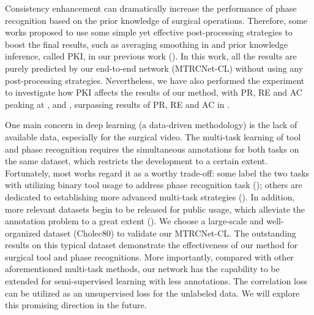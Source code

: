 \documentclass{elsarticle}
\begin{document}
Consistency enhancement can dramatically increase the performance of phase recognition based on the prior knowledge of surgical operations.
Therefore, some works proposed to use some simple yet effective post-processing strategies to boost the final results, such as averaging smoothing in \cite{cadene2016m2cai} and prior knowledge inference, called PKI, in our previous work (\cite{jin2018sv}).
In this work, all the results are purely predicted by our end-to-end network (MTRCNet-CL) without using any post-processing strategies.
Nevertheless, we have also performed the experiment to investigate how PKI affects the results of our method, with PR, RE and AC peaking at ,  and , surpassing results of  PR,  RE and  AC in \cite{jin2018sv}.


One main concern in deep learning (a data-driven methodology) is the lack of available data, especially for the surgical video.
The multi-task learning of tool and phase recognition requires the simultaneous annotations for both tasks on the same dataset, which restricts the development to a certain extent.
Fortunately, most works regard it as a worthy trade-off: some label the two tasks with utilizing binary tool usage to address phase recognition task (\cite{padoy2012statistical,yu2019assessment}); others are dedicated to establishing more advanced multi-task strategies (\cite{zisimopoulos2018deepphase,nakawala2019deep}).
In addition, more relevant datasets begin to be released for public usage, which alleviate the annotation problem to a great extent (\cite{nakawala2019deep,miccai2018}).
We choose a large-scale and well-organized dataset (Cholec80) to validate our MTRCNet-CL. The outstanding results on this typical dataset demonstrate the effectiveness of our method for surgical tool and phase recognitions.
More importantly, compared with other aforementioned multi-task methods, our network has the capability to be extended for semi-supervised learning with less annotations.
The correlation loss can be utilized as an unsupervised loss for the unlabeled data. We will explore this promising direction in the future.
\end{document}
